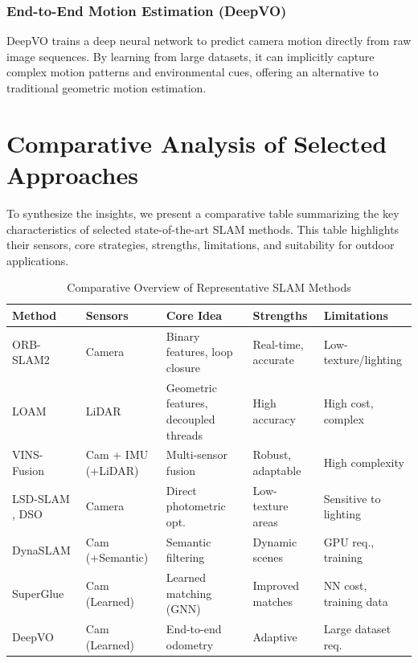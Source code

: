 \documentclass[conference]{IEEEtran}
\begin{document}
\subsubsection{End-to-End Motion Estimation (DeepVO)}
DeepVO trains a deep neural network to predict camera motion directly from raw image sequences. By learning from large datasets, it can implicitly capture complex motion patterns and environmental cues, offering an alternative to traditional geometric motion estimation.

\section{Comparative Analysis of Selected Approaches}
To synthesize the insights, we present a comparative table summarizing the key characteristics of selected state-of-the-art SLAM methods. This table highlights their sensors, core strategies, strengths, limitations, and suitability for outdoor applications.

\begin{table}[htbp]
\caption{Comparative Overview of Representative SLAM Methods}
\begin{center}
\begin{adjustbox}{width=\columnwidth,center}
\begin{tabular}{|p{1.5cm}|p{1.3cm}|p{2.3cm}|p{1.5cm}|p{1.5cm}|}
\hline
\textbf{Method} & \textbf{Sensors} & \textbf{Core Idea} & \textbf{Strengths} & \textbf{Limitations} \\
\hline
ORB-SLAM2 \cite{1} & Camera & Binary features, loop closure & Real-time, accurate & Low-texture/lighting \\
\hline
LOAM \cite{2} & LiDAR & Geometric features, decoupled threads & High accuracy & High cost, complex \\
\hline
VINS-Fusion \cite{3} & Cam + IMU (+LiDAR) & Multi-sensor fusion & Robust, adaptable & High complexity \\
\hline
LSD-SLAM \cite{4}, DSO \cite{5} & Camera & Direct photometric opt. & Low-texture areas & Sensitive to lighting \\
\hline
DynaSLAM \cite{6} & Cam (+Semantic) & Semantic filtering & Dynamic scenes & GPU req., training \\
\hline
SuperGlue \cite{7} & Cam (Learned) & Learned matching (GNN) & Improved matches & NN cost, training data \\
\hline
DeepVO \cite{8} & Cam (Learned) & End-to-end odometry & Adaptive & Large dataset req. \\
\hline
\end{tabular}
\end{adjustbox}
\label{tab:comparison}
\end{center}
\end{table}
\end{document}
